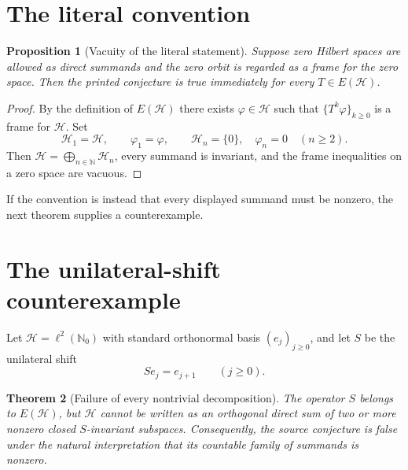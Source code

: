 \documentclass[11pt]{article}
\newtheorem{theorem}{Theorem}
\newtheorem{proposition}[theorem]{Proposition}
\newcommand{\Hh}{\mathcal H}
\newcommand{\N}{\mathbb N}
\begin{document}
\section{The literal convention}

\begin{proposition}[Vacuity of the literal statement]\label{prop:literal}
Suppose zero Hilbert spaces are allowed as direct summands and the zero orbit
is regarded as a frame for the zero space.  Then the printed conjecture is
true immediately for every $T\in E(\Hh)$.
\end{proposition}

\begin{proof}
By the definition of $E(\Hh)$ there exists $\varphi\in\Hh$ such that
$\{T^k\varphi\}_{k\ge0}$ is a frame for $\Hh$.  Set
\[
 \Hh_1=\Hh,\qquad \varphi_1=\varphi,
 \qquad \Hh_n=\{0\},\quad \varphi_n=0\quad(n\ge2).
\]
Then $\Hh=\bigoplus_{n\in\N}\Hh_n$, every summand is invariant,
and the frame inequalities on a zero space are vacuous.
\end{proof}

If the convention is instead that every displayed summand must be nonzero,
the next theorem supplies a counterexample.

\section{The unilateral-shift counterexample}

Let $\Hh=\ell^2(\N_0)$ with standard orthonormal basis
$(e_j)_{j\ge0}$, and let $S$ be the unilateral shift
\[
 Se_j=e_{j+1}\qquad(j\ge0).
\]

\begin{theorem}[Failure of every nontrivial decomposition]
\label{thm:counterexample}
The operator $S$ belongs to $E(\Hh)$, but $\Hh$ cannot be written as an
orthogonal direct sum of two or more nonzero closed $S$-invariant subspaces.
Consequently, the source conjecture is false under the natural interpretation
that its countable family of summands is nonzero.
\end{theorem}
\end{document}
